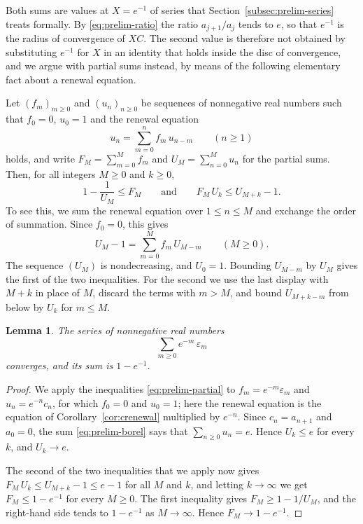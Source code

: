 \documentclass{amsart}
\newtheorem{lemma}[theorem]{Lemma}
\theoremstyle{definition}
\theoremstyle{remark}
\numberwithin{equation}{section}
\begin{document}
Both sums are values at $X=e^{-1}$ of series that Section~\ref{subsec:prelim-series} treats formally. By \eqref{eq:prelim-ratio} the ratio $a_{j+1}/a_j$ tends to $e$, so that $e^{-1}$ is the radius of convergence of $XC$. The second value is therefore not obtained by substituting $e^{-1}$ for $X$ in an identity that holds inside the disc of convergence, and we argue with partial sums instead, by means of the following elementary fact about a renewal equation.

Let $(f_m)_{m\ge 0}$ and $(u_n)_{n\ge 0}$ be sequences of nonnegative real numbers such that $f_0=0$, $u_0=1$ and the renewal equation
\[
u_n=\sum_{m=0}^{n}f_m\,u_{n-m}\qquad(n\ge 1)
\]
holds, and write $F_M=\sum_{m=0}^{M}f_m$ and $U_M=\sum_{n=0}^{M}u_n$ for the partial sums. Then, for all integers $M\ge 0$ and $k\ge 0$,
\begin{equation}\label{eq:prelim-partial}
1-\frac{1}{U_M}\le F_M\qquad\text{and}\qquad F_M\,U_k\le U_{M+k}-1.
\end{equation}
To see this, we sum the renewal equation over $1\le n\le M$ and exchange the order of summation. Since $f_0=0$, this gives
\[
U_M-1=\sum_{m=0}^{M}f_m\,U_{M-m}\qquad(M\ge 0).
\]
The sequence $(U_M)$ is nondecreasing, and $U_0=1$. Bounding $U_{M-m}$ by $U_M$ gives the first of the two inequalities. For the second we use the last display with $M+k$ in place of $M$, discard the terms with $m>M$, and bound $U_{M+k-m}$ from below by $U_k$ for $m\le M$.

\begin{lemma}\label{lem:epsmass}
The series of nonnegative real numbers
\[
\sum_{m\ge 0}e^{-m}\,\varepsilon_m
\]
converges, and its sum is $1-e^{-1}$.
\end{lemma}

\begin{proof}
We apply the inequalities \eqref{eq:prelim-partial} to $f_m=e^{-m}\varepsilon_m$ and $u_n=e^{-n}c_n$, for which $f_0=0$ and $u_0=1$; here the renewal equation is the equation of Corollary~\ref{cor:crenewal} multiplied by $e^{-n}$. Since $c_n=a_{n+1}$ and $a_0=0$, the sum \eqref{eq:prelim-borel} says that $\sum_{n\ge 0}u_n=e$. Hence $U_k\le e$ for every $k$, and $U_k\to e$.

The second of the two inequalities that we apply now gives $F_M\,U_k\le U_{M+k}-1\le e-1$ for all $M$ and $k$, and letting $k\to\infty$ we get $F_M\le 1-e^{-1}$ for every $M\ge 0$. The first inequality gives $F_M\ge 1-1/U_M$, and the right-hand side tends to $1-e^{-1}$ as $M\to\infty$. Hence $F_M\to 1-e^{-1}$.
\end{proof}
\end{document}
